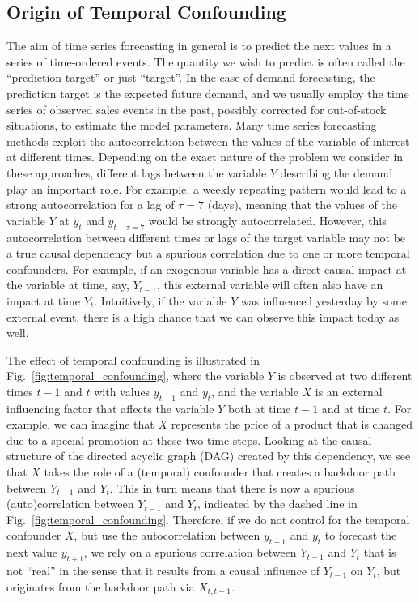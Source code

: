 \documentclass[BCOR=1mm, DIV=calc,10pt,
twoside=true,
twocolumn,
headings=normal]{scrartcl}
\newcommand{\fig}{Fig.~}
\begin{document}
\subsection{Origin of Temporal Confounding}
\label{sec:IntroTempConfound}

The aim of time series forecasting in general is to predict the next values in a series of time-ordered events. The quantity we wish to predict is often called the ``prediction target'' or just ``target''. In the case of demand forecasting, the prediction target is the expected future demand, and we usually employ the time series of observed sales events in the past, possibly corrected for out-of-stock situations, to estimate the model parameters. Many time series forecasting methods exploit the autocorrelation between the values of the variable of interest at different times. Depending on the exact nature of the problem we consider in these approaches, different lags between the variable $Y$ describing the demand play an important role. For example, a weekly repeating pattern would lead to a strong autocorrelation for a lag of $\tau=7$ (days), meaning that the values of the variable $Y$ at $y_t$ and $y_{t-\tau=7}$ would be strongly autocorrelated.  However, this autocorrelation between different times or lags of the target variable may not be a true causal dependency but a spurious correlation due to one or more temporal confounders. For example, if an exogenous variable has a direct causal impact at the variable at time, say,  $Y_{t-1}$, this external variable will often also have an impact at time $Y_t$. Intuitively, if the variable $Y$ was influenced yesterday by some external event, there is a high chance that we can observe this impact today as well.

The effect of temporal confounding is illustrated in \fig \ref{fig:temporal_confounding}, where the variable $Y$ is observed at two different times $t-1$ and $t$ with values $y_{t-1}$ and $y_t$, and the variable $X$ is an external influencing factor that affects the variable $Y$ both at time $t-1$ and at time $t$. For example, we can imagine that $X$ represents the price of a product that is changed due to a special promotion at these two time steps. Looking at the causal structure of the directed acyclic graph (DAG) created by this dependency, we see that  $X$ takes the role of a (temporal) confounder that creates a backdoor path between $Y_{t-1}$ and $Y_t$. This in turn means that there is now a spurious (auto)correlation between $Y_{t-1}$ and $Y_t$, indicated by the dashed line in \fig \ref{fig:temporal_confounding}. Therefore, if we do not control for the temporal confounder $X$, but use the autocorrelation between $y_{t-1}$ and $y_t$ to forecast the next value $y_{t+1}$, we rely on a spurious correlation between $Y_{t-1}$ and $Y_t$ that is not ``real'' in the sense that it results from a causal influence of $Y_{t-1}$ on $Y_t$, but originates from the backdoor path via $X_{t, t-1}$.
\end{document}
